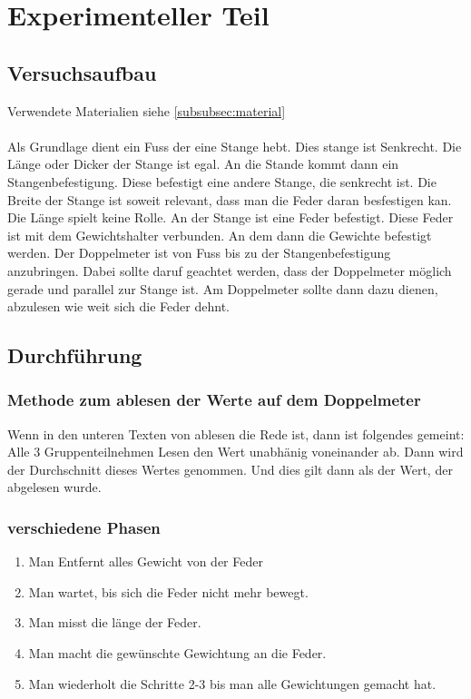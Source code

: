 \documentclass[../main.tex]{subfiles} %
\begin{document}
\section{Experimenteller Teil}\label{sec:experimenteller-teil}
    \subsection{Versuchsaufbau}\label{subsec:versuchsaufbau}

        Verwendete Materialien siehe \ref{subsubsec:material} \\ \\
        Als Grundlage dient ein Fuss der eine Stange hebt. Dies stange ist Senkrecht.
        Die Länge oder Dicker der Stange ist egal. An die Stande kommt dann ein Stangenbefestigung.
        Diese befestigt eine andere Stange, die senkrecht ist.
        Die Breite der Stange ist soweit relevant, dass man die Feder daran besfestigen kan. Die Länge spielt keine Rolle.
        An der Stange ist eine Feder befestigt. Diese Feder ist mit dem Gewichtshalter verbunden.
        An dem dann die Gewichte befestigt werden.
        Der Doppelmeter ist von Fuss bis zu der Stangenbefestigung anzubringen. Dabei sollte daruf geachtet werden, dass der Doppelmeter möglich gerade und parallel zur Stange ist.
        Am Doppelmeter sollte dann dazu dienen, abzulesen wie weit sich die Feder dehnt.

        \subsection{Durchführung}\label{subsec:durchfuhrung}

        \subsubsection{Methode zum ablesen der Werte auf dem Doppelmeter}\label{subsubsec:methode-zum-ablesen-der-werte-auf-dem-doppelmeter}

        Wenn in den unteren Texten von ablesen die Rede ist, dann ist folgendes gemeint:
        Alle 3 Gruppenteilnehmen Lesen den Wert unabhänig voneinander ab. Dann wird der Durchschnitt dieses Wertes genommen. Und dies gilt dann als der Wert, der abgelesen wurde.




        \subsubsection{verschiedene Phasen}\label{subsubsec:schritt-fur-schritt-anleitung}
        \begin{enumerate}
            \item Man Entfernt alles Gewicht von der Feder
            \item Man wartet, bis sich die Feder nicht mehr bewegt.
            \item Man misst die länge der Feder.
            \item Man macht die gewünschte Gewichtung an die Feder.
            \item Man wiederholt die Schritte 2-3 bis man alle Gewichtungen gemacht hat.
        \end{enumerate}
\end{document}
